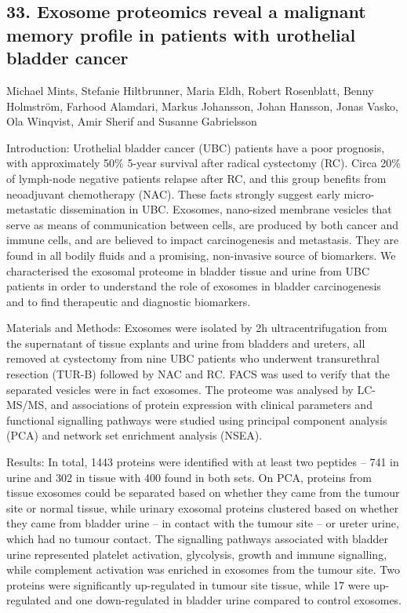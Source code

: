 \subsection*{\color{eubicRed} 33. Exosome proteomics reveal a malignant memory profile in patients with urothelial bladder cancer}
{\color{eubicGray}Michael Mints, Stefanie Hiltbrunner, Maria Eldh, Robert Rosenblatt, Benny Holmström, Farhood Alamdari, Markus Johansson, Johan Hansson, Jonas Vasko, Ola Winqvist, Amir Sherif and Susanne Gabrielsson}

Introduction: Urothelial bladder cancer (UBC) patients have a poor prognosis, with approximately 50\% 5-year survival after radical cystectomy (RC). Circa 20\% of lymph-node negative patients relapse after RC, and this group benefits from neoadjuvant chemotherapy (NAC). These facts strongly suggest early micro-metastatic dissemination in UBC. Exosomes, nano-sized membrane vesicles that serve as means of communication between cells, are produced by both cancer and immune cells, and are believed to impact carcinogenesis and metastasis. They are found in all bodily fluids and a promising, non-invasive source of biomarkers. We characterised the exosomal proteome in bladder tissue and urine from UBC patients in order to understand the role of exosomes in bladder carcinogenesis and to find therapeutic and diagnostic biomarkers.


Materials and Methods: Exosomes were isolated by 2h ultracentrifugation from the supernatant of tissue explants and urine from bladders and ureters, all removed at cystectomy from nine UBC patients who underwent transurethral resection (TUR-B) followed by NAC and RC. FACS was used to verify that the separated vesicles were in fact exosomes. The proteome was analysed by LC-MS/MS, and associations of protein expression with clinical parameters and functional signalling pathways were studied using principal component analysis (PCA) and network set enrichment analysis (NSEA).


Results: In total, 1443 proteins were identified with at least two peptides – 741 in urine and 302 in tissue with 400 found in both sets. On PCA, proteins from tissue exosomes could be separated based on whether they came from the tumour site or normal tissue, while urinary exosomal proteins clustered based on whether they came from bladder urine – in contact with the tumour site – or ureter urine, which had no tumour contact. The signalling pathways associated with bladder urine represented platelet activation, glycolysis, growth and immune signalling, while complement activation was enriched in exosomes from the tumour site. Two proteins were significantly up-regulated in tumour site tissue, while 17 were up-regulated and one down-regulated in bladder urine compared to control exosomes.


